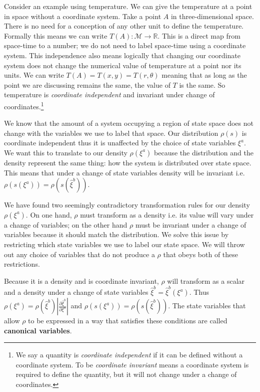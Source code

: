 \documentclass{article}
\begin{document}
	 Consider an example using temperature. We can give the temperature at a point in space without a coordinate system. Take a point $A$ in three-dimensional space. There is no need for a conception of any other unit to define the temperature. Formally this means we can write $T(A): \mathcal{M} \to \mathbb{R}$. This is a direct map from space-time to a number; we do not need to label space-time using a coordinate system. This independence also means logically that changing our coordinate system does not change the numerical value of temperature at a point nor its units. We can write $T(A) = T(x,y) = T(r,\theta)$ meaning that as long as the point we are discussing remains the same, the value of $T$ is the same. So temperature is \textit{coordinate independent} and invariant under change of coordinates.\footnote{We say a quantity is \textit{coordinate independent} if it can be defined without a  coordinate system. To be \textit{coordinate invariant} means a coordinate system is required to define the quantity, but it will not change under a change of coordinates.}
	 
 
	We know that the amount of a system occupying a region of state space does not change with the variables we use to label that space. Our distribution $\rho(s)$ is coordinate independent thus it is unaffected  by the choice of state variables $\xi^a$. We want this to translate to our density $\rho(\xi^a)$ because the distribution and the density represent the same thing: how the system is distributed over state space. This means that under a change of state variables density will be invariant i.e. $\rho(s(\xi^a)) = \rho(s(\hat{\xi}^b))$.
	

	We have found two seemingly contradictory transformation rules for our density $\rho(\xi^a)$. On one hand, $\rho$ must transform as a density i.e. its value will vary under a change of variables; on the other hand $\rho$ must be invariant under a change of variables because it should match the distribution. We solve this issue by restricting which state variables we use to label our state space. We will throw out any choice of variables that do not produce a $\rho$ that obeys both of these restrictions.
	

\begin{prop}
	Because it is a density and is coordinate invariant, $\rho$ will transform as a scalar and a density under a change of state variables $\hat{\xi}^b = \hat{\xi}^b(\xi^a)$. Thus $\rho(\xi^a) = \rho(\hat{\xi}^b)\left|\frac{\partial\hat{\xi}^b}{\partial\xi^a}\right|$ and $\rho(s(\xi^a)) = \rho(s(\hat{\xi}^b))$. The state variables that allow $\rho$ to be expressed in a way that satisfies these conditions are called \textbf{canonical variables}.
\end{prop}
\end{document}
